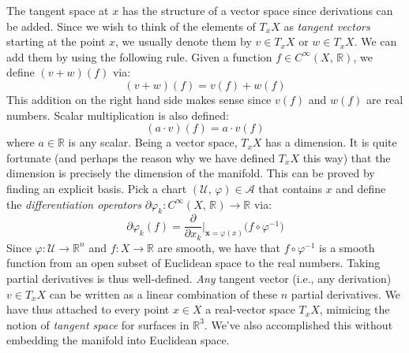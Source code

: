 \documentclass{article}
\theoremstyle{plain}
\theoremstyle{normal}
\begin{document}
        The tangent space at $x$ has the structure of a vector space since
        derivations can be added. Since we wish to think of the elements of
        $T_{x}X$ as \textit{tangent vectors} starting at the point $x$, we
        usually denote them by $v\in{T}_{x}X$ or $w\in{T}_{x}X$. We can add
        them by using the following rule. Given a function
        $f\in{C}^{\infty}(X,\,\mathbb{R})$, we define $(v+w)(f)$ via:
        \begin{equation}
            (v+w)(f)=v(f)+w(f)
        \end{equation}
        This addition on the right hand side makes sense since $v(f)$ and $w(f)$
        are real numbers. Scalar multiplication is also defined:
        \begin{equation}
            (a\cdot{v})(f)=a\cdot{v}(f)
        \end{equation}
        where $a\in\mathbb{R}$ is any scalar. Being a vector space, $T_{x}X$ has
        a dimension. It is quite fortunate (and perhaps the reason why we have
        defined $T_{x}X$ this way) that the dimension is precisely the
        dimension of the manifold. This can be proved by finding an explicit
        basis. Pick a chart $(\mathcal{U},\,\varphi)\in\mathcal{A}$ that
        contains $x$ and define the \textit{differentiation operators}
        $\partial\varphi_{k}:C^{\infty}(X,\,\mathbb{R})\rightarrow\mathbb{R}$
        via:
        \begin{equation}
            \partial\varphi_{k}(f)=
            \frac{\partial}{\partial{x}_{k}}
            \Big|_{\mathbf{x}=\varphi(x)}\big(f\circ\varphi^{-1}\big)
        \end{equation}
        Since $\varphi:\mathcal{U}\rightarrow\mathbb{R}^{n}$ and
        $f:X\rightarrow\mathbb{R}$ are smooth, we have that
        $f\circ\varphi^{-1}$ is a smooth function from an open subset of
        Euclidean space to the real numbers. Taking partial derivatives is
        thus well-defined. \textit{Any} tangent vector (i.e., any derivation)
        $v\in{T}_{x}X$ can be written as a linear combination of these
        $n$ partial derivatives. We have thus attached to every point
        $x\in{X}$ a real-vector space $T_{x}X$, mimicing the notion of
        \textit{tangent space} for surfaces in $\mathbb{R}^{3}$. We've also
        accomplished this without embedding the manifold into Euclidean space.
\end{document}
